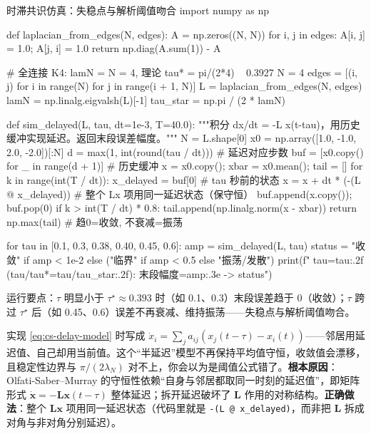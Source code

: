 \begin{codebox}[Python]{时滞共识仿真：失稳点与解析阈值吻合}
import numpy as np

def laplacian_from_edges(N, edges):
    A = np.zeros((N, N))
    for i, j in edges:
        A[i, j] = 1.0; A[j, i] = 1.0
    return np.diag(A.sum(1)) - A

# 全连接 K4: lamN = N = 4, 理论 tau* = pi/(2*4) ~ 0.3927
N = 4
edges = [(i, j) for i in range(N) for j in range(i + 1, N)]
L = laplacian_from_edges(N, edges)
lamN = np.linalg.eigvalsh(L)[-1]
tau_star = np.pi / (2 * lamN)

def sim_delayed(L, tau, dt=1e-3, T=40.0):
    """积分 dx/dt = -L x(t-tau)，用历史缓冲实现延迟。返回末段误差幅度。"""
    N = L.shape[0]
    x0 = np.array([1.0, -1.0, 2.0, -2.0])[:N]
    d = max(1, int(round(tau / dt)))         # 延迟对应步数
    buf = [x0.copy() for _ in range(d + 1)]   # 历史缓冲
    x = x0.copy(); xbar = x0.mean(); tail = []
    for k in range(int(T / dt)):
        x_delayed = buf[0]                    # tau 秒前的状态
        x = x + dt * (-(L @ x_delayed))       # 整个 Lx 项用同一延迟状态（保守恒）
        buf.append(x.copy()); buf.pop(0)
        if k > int(T / dt) * 0.8:
            tail.append(np.linalg.norm(x - xbar))
    return np.max(tail)                       # 趋0=收敛, 不衰减=振荡

for tau in [0.1, 0.3, 0.38, 0.40, 0.45, 0.6]:
    amp = sim_delayed(L, tau)
    status = "收敛" if amp < 1e-2 else ("临界" if amp < 0.5 else "振荡/发散")
    print(f"  tau={tau:.2f} (tau/tau*={tau/tau_star:.2f}): 末段幅度={amp:.3e} -> {status}")
\end{codebox}

\noindent 运行要点：$\tau$ 明显小于 $\tau^\star\approx0.393$ 时（如 0.1、0.3）末段误差趋于 0（收敛）；$\tau$ 跨过 $\tau^\star$ 后（如 0.45、0.6）误差不再衰减、维持振荡——失稳点与解析阈值吻合。

\begin{pitfall}
实现 \cref{eq:cs-delay-model} 时写成 $\dot x_i=\sum_j a_{ij}(x_j(t-\tau)-x_i(t))$——邻居用延迟值、自己却用当前值。这个“半延迟”模型不再保持平均值守恒，收敛值会漂移，且稳定性边界与 $\pi/(2\lambda_N)$ 对不上，你会以为是阈值公式错了。\textbf{根本原因}：Olfati-Saber--Murray 的守恒性依赖“自身与邻居都取同一时刻的延迟值”，即矩阵形式 $\dot{\mathbf{x}}=-\mathbf{L}\mathbf{x}(t-\tau)$ 整体延迟；拆开延迟破坏了 $\mathbf{L}$ 作用的对称结构。\textbf{正确做法}：整个 $\mathbf{L}\mathbf{x}$ 项用同一延迟状态（代码里就是 \verb|-(L @ x_delayed)|，而非把 $\mathbf{L}$ 拆成对角与非对角分别延迟）。
\end{pitfall}


